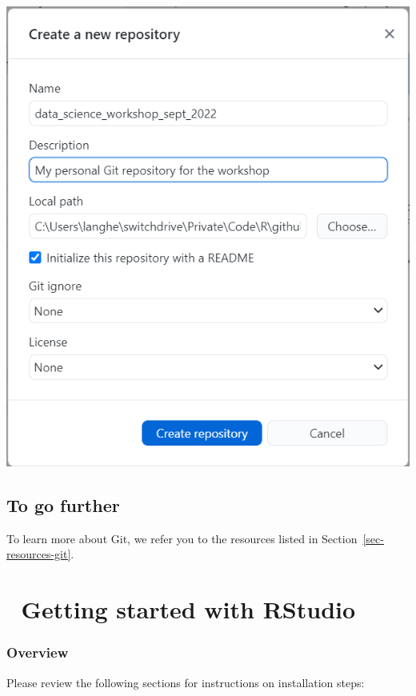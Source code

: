 \documentclass[
  letterpaper,
  DIV=11,
  numbers=noendperiod]{scrreprt}
\begin{document}
\includegraphics{./images/paste-D831B36F.png}

\hypertarget{to-go-further}{%
\section{To go further}\label{to-go-further}}

To learn more about Git, we refer you to the resources listed in
Section~\ref{sec-resources-git}.

\hypertarget{getting-started-with-rstudio}{%
\chapter{\texorpdfstring{{📘} Getting started with
RStudio}{📘 Getting started with RStudio}}\label{getting-started-with-rstudio}}

\hypertarget{overview-2}{%
\subsection{Overview}\label{overview-2}}

Please review the following sections for instructions on installation
steps:
\end{document}
